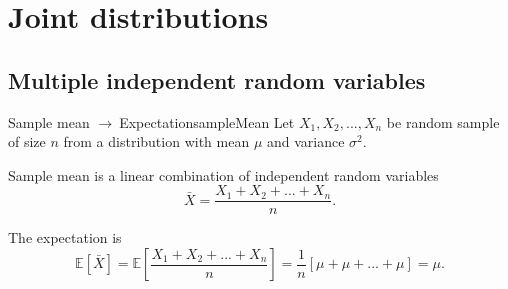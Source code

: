 \documentclass[11pt,a4paper,fleqn]{article}
\numberwithin{equation}{section}
\newcommand{\g}{$\rightarrow\ $}
\newcommand{\mean}[1]{\bar{#1}}
\begin{document}
\section{Joint distributions}

\subsection{Multiple independent random variables}

\begin{fact}{Sample mean \g  Expectation}{sampleMean}
    Let $X_1,X_2,...,X_n$ be random sample of size $n$ from a distribution with mean $\mu$ and variance $\sigma^2$.

    Sample mean is a linear combination of independent random variables
    \begin{equation*}
        \mean{X}=\frac{X_1+X_2+...+X_n}{n}.
    \end{equation*}

    The expectation is
    \begin{equation*}
        \mathbb{E}[\mean{X}]=\mathbb{E}[\frac{X_1+X_2+...+X_n}{n}]=\frac{1}{n}[\mu+\mu+...+\mu]=\mu.
    \end{equation*}
\end{fact}
\end{document}
